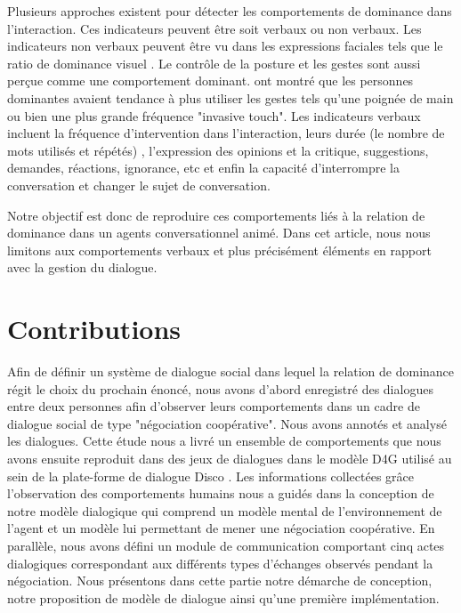 \documentclass [french]{sig-alternate-05-2015}
\begin{document}
\par Plusieurs approches existent pour détecter les comportements de dominance dans l'interaction. Ces indicateurs peuvent être soit verbaux ou non verbaux. Les indicateurs non verbaux peuvent être vu dans les expressions faciales tels que le ratio de dominance visuel \cite{dunbar2005perceptions}. Le contrôle de la posture et les gestes sont aussi perçue comme une comportement dominant. \cite{hall2005nonverbal} ont montré que les personnes dominantes avaient tendance à plus utiliser les gestes tels qu'une poignée de main ou bien une plus grande fréquence "invasive touch". Les indicateurs verbaux incluent la fréquence d'intervention dans l'interaction, leurs durée (le nombre de mots utilisés et répétés) \cite{dunbar2005perceptions}, l'expression des opinions et la critique, suggestions, demandes, réactions, ignorance, etc \cite{zablotskaya2012relating} et enfin la capacité d'interrompre la conversation et changer le sujet de conversation.

Notre objectif est donc de reproduire ces comportements liés à la relation de dominance dans un agents conversationnel animé. Dans cet article, nous nous limitons aux comportements verbaux et plus précisément éléments en rapport avec la gestion du dialogue.

\section{Contributions}
\label{contribution}

\par Afin de définir un système de dialogue social dans lequel la relation de dominance régit le choix du prochain énoncé, nous avons d'abord enregistré des dialogues entre deux personnes afin d'observer leurs comportements dans un cadre de dialogue social de type "négociation coopérative". Nous avons annotés et analysé les dialogues. Cette étude nous a livré un ensemble de comportements  que nous avons ensuite reproduit dans des jeux de dialogues dans le modèle D4G utilisé au sein de la plate-forme de dialogue Disco \cite{rich2009building}. 
 Les informations collectées grâce l'observation des comportements humains nous a guidés dans la conception de notre modèle dialogique qui comprend un modèle mental de l'environnement de l'agent et un modèle lui permettant de mener une négociation coopérative. 
En parallèle, nous avons défini un module de communication comportant cinq actes dialogiques correspondant aux différents types d'échanges observés pendant la négociation. Nous présentons dans cette partie notre démarche de conception, notre proposition de modèle de dialogue ainsi qu'une première implémentation.
\end{document}
